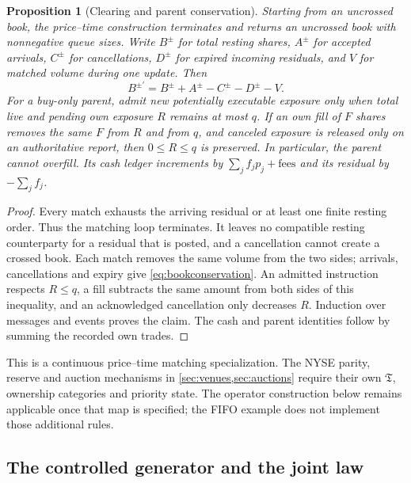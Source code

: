 \documentclass[11pt]{article}
\numberwithin{equation}{section}
\newtheorem{proposition}[theorem]{Proposition}
\theoremstyle{definition}
\theoremstyle{remark}
\theoremstyle{definition}
\begin{document}
\begin{proposition}[Clearing and parent conservation]\label{prop:taggedconservation}
Starting from an uncrossed book, the price--time construction terminates and
returns an uncrossed book with nonnegative queue sizes. Write $B^\pm$ for
total resting shares, $A^\pm$ for accepted arrivals, $C^\pm$ for cancellations,
$D^\pm$ for expired incoming residuals, and $V$ for matched volume during
one update. Then
\begin{equation}\label{eq:bookconservation}
 B^{\pm\prime}=B^\pm+A^\pm-C^\pm-D^\pm-V.
\end{equation}
For a buy-only parent, admit new potentially executable exposure only when
total live and pending own exposure $R$ remains at most $q$. If an own fill
of $F$ shares removes the same $F$ from $R$ and from $q$, and canceled
exposure is released only on an authoritative report, then $0\le R\le q$
is preserved. In particular, the parent cannot overfill. Its cash ledger
increments by $\sum_j f_jp_j+\mathrm{fees}$ and its residual by
$-\sum_jf_j$.
\end{proposition}
\begin{proof}
Every match exhausts the arriving residual or at least one finite resting
order. Thus the matching loop terminates. It leaves no compatible resting
counterparty for a residual that is posted, and a cancellation cannot create
a crossed book. Each match removes the same volume from the two sides;
arrivals, cancellations and expiry give \eqref{eq:bookconservation}.
An admitted instruction respects $R\le q$, a fill subtracts the same amount
from both sides of this inequality, and an acknowledged cancellation only
decreases $R$. Induction over messages and events proves the claim. The
cash and parent identities follow by summing the recorded own trades.
\end{proof}

This is a continuous price--time matching specialization. The NYSE parity,
reserve and auction mechanisms in \cref{sec:venues,sec:auctions} require
their own $\mathfrak T$, ownership categories and priority state. The
operator construction below remains applicable once that map is specified;
the FIFO example does not implement those additional rules.

\subsection{The controlled generator and the joint law}
\end{document}
